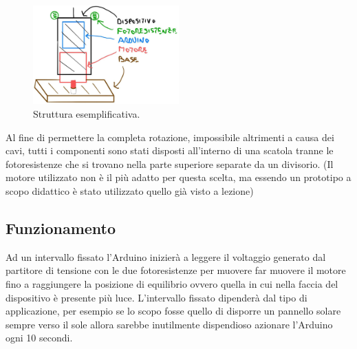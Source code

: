 \documentclass[12pt,oneside,a4paper]{article}
\begin{document}
\begin{figure}[ht!]
    \centering
    \includegraphics[width=0.5\textwidth]{figures/modello_solar_tracker}
    \caption{Struttura esemplificativa.}
\end{figure}
Al fine di permettere la completa rotazione, impossibile altrimenti a causa dei cavi, tutti i componenti sono stati disposti all'interno di una scatola tranne le fotoresistenze che si trovano nella parte superiore separate da un divisorio. (Il motore utilizzato non è il più adatto per questa scelta, ma essendo un prototipo a scopo didattico è stato utilizzato quello già visto a lezione)

\subsection{Funzionamento}
Ad un intervallo fissato l'Arduino inizierà a leggere il voltaggio generato dal partitore di tensione con le due fotoresistenze per muovere far muovere il motore fino a raggiungere la posizione di equilibrio ovvero quella in cui nella faccia del dispositivo è presente più luce.
L'intervallo fissato dipenderà dal tipo di applicazione, per esempio se lo scopo fosse quello di disporre un pannello solare sempre verso il sole allora sarebbe inutilmente dispendioso azionare l'Arduino ogni 10 secondi.
\end{document}

